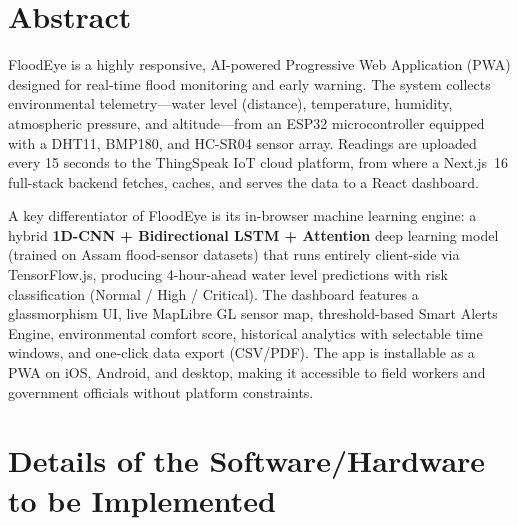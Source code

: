 \documentclass[10pt,a4paper]{article}
\begin{document}
\vspace{0.4cm}

\section*{Abstract}

FloodEye is a highly responsive, AI-powered Progressive Web Application (PWA) designed
for real-time flood monitoring and early warning. The system collects environmental
telemetry---water level (distance), temperature, humidity, atmospheric pressure, and
altitude---from an ESP32 microcontroller equipped with a DHT11, BMP180, and HC-SR04
sensor array. Readings are uploaded every 15 seconds to the ThingSpeak IoT cloud
platform, from where a Next.js~16 full-stack backend fetches, caches, and serves the
data to a React dashboard.

A key differentiator of FloodEye is its in-browser machine learning engine: a hybrid
\textbf{1D-CNN + Bidirectional LSTM + Attention} deep learning model (trained on Assam
flood-sensor datasets) that runs entirely client-side via TensorFlow.js, producing
4-hour-ahead water level predictions with risk classification (Normal / High / Critical).
The dashboard features a glassmorphism UI, live MapLibre GL sensor map, threshold-based
Smart Alerts Engine, environmental comfort score, historical analytics with selectable
time windows, and one-click data export (CSV/PDF). The app is installable as a PWA on
iOS, Android, and desktop, making it accessible to field workers and government officials
without platform constraints.

\vspace{0.4cm}

\section*{Details of the Software/Hardware to be Implemented}
\end{document}
